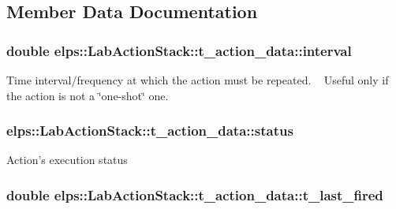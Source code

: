 \subsection{Member Data Documentation}
\hypertarget{structelps_1_1_lab_action_stack_1_1t__action__data_ab7ed5a859298170fb29075a8ae579d51}{
\subsubsection[{interval}]{\setlength{\rightskip}{0pt plus 5cm}double elps\+::\+Lab\+Action\+Stack\+::t\+\_\+action\+\_\+data\+::interval}}\label{structelps_1_1_lab_action_stack_1_1t__action__data_ab7ed5a859298170fb29075a8ae579d51}
Time interval/frequency at which the action must be repeated. ~\newline
 Useful only if the action is not a \char`\"{}one-\/shot\char`\"{} one. \hypertarget{structelps_1_1_lab_action_stack_1_1t__action__data_ae1da3e7f507a4c2266dd815a4d729575}{
\subsubsection[{status}]{ elps\+::\+Lab\+Action\+Stack\+::t\+\_\+action\+\_\+data\+::status}}\label{structelps_1_1_lab_action_stack_1_1t__action__data_ae1da3e7f507a4c2266dd815a4d729575}
Action's execution status \hypertarget{structelps_1_1_lab_action_stack_1_1t__action__data_a692a5e74dd664d0da5ea2a74961000ec}{
\subsubsection[{t\+\_\+last\+\_\+fired}]{\setlength{\rightskip}{0pt plus 5cm}double elps\+::\+Lab\+Action\+Stack\+::t\+\_\+action\+\_\+data\+::t\+\_\+last\+\_\+fired}}\label{structelps_1_1_lab_action_stack_1_1t__action__data_a692a5e74dd664d0da5ea2a74961000ec}
